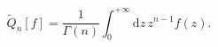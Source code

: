 \begin{equation}
\tilde Q_n[f]=\frac1{\Gamma(n)}\int_0^{+\infty}\mathrm{d}z\,z^{n-1}f(z).
\end{equation}

